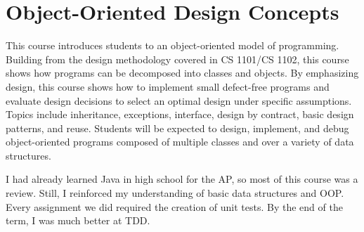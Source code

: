 \section{Object-Oriented Design Concepts}

\begin{meta}
\end{meta}

\coursedesc
This course introduces students to an object-oriented model of
programming. Building from the design methodology covered in CS 1101/CS
1102, this course shows how programs can be decomposed into classes
and objects. By emphasizing design, this course shows how to implement
small defect-free programs and evaluate design decisions to select an
optimal design under specific assumptions. Topics include inheritance,
exceptions, interface, design by contract, basic design patterns,
and reuse. Students will be expected to design, implement, and debug
object-oriented programs composed of multiple classes and over a variety
of data structures.

\courseself
I had already learned Java in high school for the AP, so most of this
course was a review. Still, I reinforced my understanding of basic data
structures and OOP. Every assignment we did required the creation of
unit tests. By the end of the term, I was much better at TDD.

